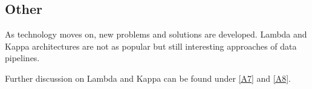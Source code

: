\subsection{Other}\label{Other}
As technology moves on, new problems and solutions are developed. Lambda and Kappa architectures are not as popular but still interesting approaches of data pipelines.

Further discussion on Lambda and Kappa can be found under \ref{A7} and \ref{A8}.
%

%

